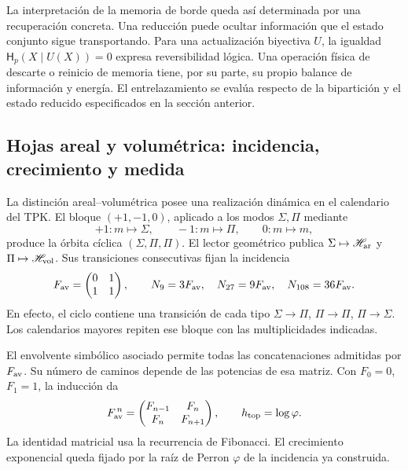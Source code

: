 La interpretación de la memoria de borde queda así determinada por
una recuperación concreta. Una reducción puede ocultar información
que el estado conjunto sigue transportando. Para una actualización
biyectiva \(U\), la igualdad \(\mathsf H_p(X\mid U(X))=0\) expresa
reversibilidad lógica. Una operación física de descarte o reinicio
de memoria tiene, por su parte, su propio balance de información y
energía. El entrelazamiento se evalúa respecto de la bipartición y
el estado reducido especificados en la sección anterior.

\subsection{Hojas areal y volumétrica: incidencia, crecimiento y medida}
\label{ii:sec:ii-hojas-av}

La distinción areal--volumétrica posee una realización dinámica en el
calendario del TPK. El bloque \((+1,-1,0)\), aplicado a los modos
\(\Sigma,\Pi\) mediante
\[
 +1:m\mapsto\Sigma,\qquad -1:m\mapsto\Pi,\qquad 0:m\mapsto m,
\]
produce la órbita cíclica \((\Sigma,\Pi,\Pi)\). El lector geométrico
publica \(\Sigma\mapsto\mathscr H_{\rm ar}\) y
\(\Pi\mapsto\mathscr H_{\rm vol}\). Sus transiciones consecutivas
fijan la incidencia
\begin{equation}
 F_{\rm av}=\begin{pmatrix}0&1\\1&1\end{pmatrix},\qquad
 N_9=3F_{\rm av},\quad N_{27}=9F_{\rm av},\quad
 N_{108}=36F_{\rm av}.
 \label{ii:eq:ii-hojas-incidencia}
\end{equation}
En efecto, el ciclo contiene una transición de cada tipo
\(\Sigma\to\Pi\), \(\Pi\to\Pi\), \(\Pi\to\Sigma\).
Los calendarios mayores repiten ese bloque con las multiplicidades
indicadas.

El envolvente simbólico asociado permite todas las concatenaciones
admitidas por \(F_{\rm av}\). Su número de caminos depende de las
potencias de esa matriz. Con \(F_0=0\), \(F_1=1\), la inducción da
\begin{equation}
 F_{\rm av}^{\,n}=
 \begin{pmatrix}F_{n-1}&F_n\\F_n&F_{n+1}\end{pmatrix},
 \qquad h_{\rm top}=\log\varphi.
 \label{ii:eq:ii-hojas-fibonacci}
\end{equation}
La identidad matricial usa la recurrencia de Fibonacci. El crecimiento
exponencial queda fijado por la raíz de Perron \(\varphi\) de la
incidencia ya construida.

